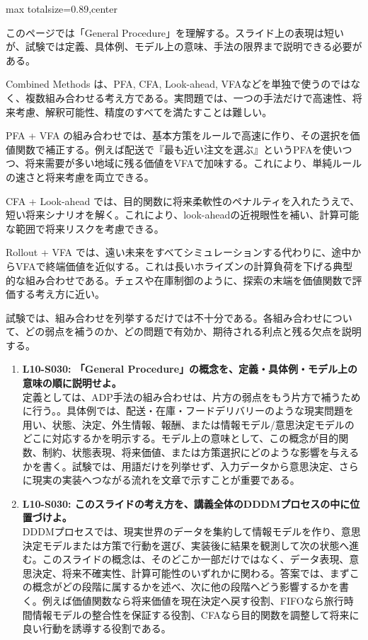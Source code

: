\begin{minipage}[t]{0.58\textwidth}
\begin{adjustbox}{max totalsize={\textwidth}{0.89\textheight},center}
\begin{minipage}{\textwidth}\scriptsize
{}このページでは「General Procedure」を理解する。スライド上の表現は短いが、試験では定義、具体例、モデル上の意味、手法の限界まで説明できる必要がある。\par
Combined Methods は、PFA, CFA, Look-ahead, VFAなどを単独で使うのではなく、複数組み合わせる考え方である。実問題では、一つの手法だけで高速性、将来考慮、解釈可能性、精度のすべてを満たすことは難しい。\par
PFA + VFA の組み合わせでは、基本方策をルールで高速に作り、その選択を価値関数で補正する。例えば配送で『最も近い注文を選ぶ』というPFAを使いつつ、将来需要が多い地域に残る価値をVFAで加味する。これにより、単純ルールの速さと将来考慮を両立できる。\par
CFA + Look-ahead では、目的関数に将来柔軟性のペナルティを入れたうえで、短い将来シナリオを解く。これにより、look-aheadの近視眼性を補い、計算可能な範囲で将来リスクを考慮できる。\par
Rollout + VFA では、遠い未来をすべてシミュレーションする代わりに、途中からVFAで終端価値を近似する。これは長いホライズンの計算負荷を下げる典型的な組み合わせである。チェスや在庫制御のように、探索の末端を価値関数で評価する考え方に近い。\par
試験では、組み合わせを列挙するだけでは不十分である。各組み合わせについて、どの弱点を補うのか、どの問題で有効か、期待される利点と残る欠点を説明する。\par{}\begin{enumerate}\item \textbf{L10-S030: 「General Procedure」の概念を、定義・具体例・モデル上の意味の順に説明せよ。}\\定義としては、ADP手法の組み合わせは、片方の弱点をもう片方で補うために行う。。具体例では、配送・在庫・フードデリバリーのような現実問題を用い、状態、決定、外生情報、報酬、または情報モデル/意思決定モデルのどこに対応するかを明示する。モデル上の意味として、この概念が目的関数、制約、状態表現、将来価値、または方策選択にどのような影響を与えるかを書く。試験では、用語だけを列挙せず、入力データから意思決定、さらに現実の実装へつながる流れを文章で示すことが重要である。\item \textbf{L10-S030: このスライドの考え方を、講義全体のDDDMプロセスの中に位置づけよ。}\\DDDMプロセスでは、現実世界のデータを集約して情報モデルを作り、意思決定モデルまたは方策で行動を選び、実装後に結果を観測して次の状態へ進む。このスライドの概念は、そのどこか一部だけではなく、データ表現、意思決定、将来不確実性、計算可能性のいずれかに関わる。答案では、まずこの概念がどの段階に属するかを述べ、次に他の段階へどう影響するかを書く。例えば価値関数なら将来価値を現在決定へ戻す役割、FIFOなら旅行時間情報モデルの整合性を保証する役割、CFAなら目的関数を調整して将来に良い行動を誘導する役割である。\end{enumerate}
\end{minipage}
\end{adjustbox}
\end{minipage}


